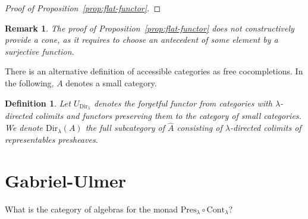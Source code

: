 \documentclass{article}
\newcommand{\Cont}[1]{\text{Cont}_{#1}}
\newcommand{\Dir}[1]{\text{Dir}_{#1}}
\newcommand{\Pres}[1]{\text{Pres}_{#1}}
\newtheorem{definition}[theorem]{Definition}
\newtheorem{remark}[theorem]{Remark}
\begin{document}
\begin{proof}[Proof of Proposition~\ref{prop:flat-functor}]


\end{proof}
\begin{remark}
 The 
 proof of Proposition~\ref{prop:flat-functor}
 does not constructively provide a cone, as it requires to choose an
 antecedent of some element by a surjective function.
\end{remark}

There is an alternative definition of accessible categories as free cocompletions.
In the following, $A$ denotes a small category.
\begin{definition}
  Let $U_{\Dir\lambda}$ denotes the forgetful functor from 
  categories with $\lambda$-directed colimits and functors preserving them to
  the category of small categories.
  We denote $\Dir\lambda(A)$ the full subcategory of $\hat{A}$ consisting of
  $\lambda$-directed colimits of representables presheaves.
\end{definition}
\section{Gabriel-Ulmer}
What is the category of algebras for the monad $\Pres\lambda\circ\Cont\lambda$?
\end{document}
